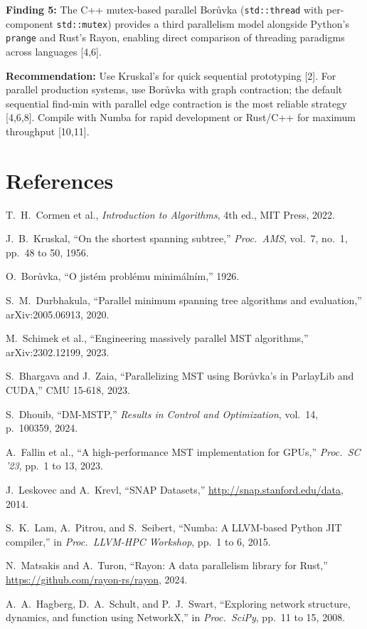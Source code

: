 \documentclass[12pt, a4paper]{article}
\begin{document}
\textbf{Finding 5:} The C++ mutex-based parallel Bor\r{u}vka (\texttt{std::thread} with per-component \texttt{std::mutex}) provides a third parallelism model alongside Python's \texttt{prange} and Rust's Rayon, enabling direct comparison of threading paradigms across languages [4,6].

\textbf{Recommendation:} Use Kruskal's for quick sequential prototyping [2]. For parallel production systems, use Bor\r{u}vka with graph contraction; the default sequential find-min with parallel edge contraction is the most reliable strategy [4,6,8]. Compile with Numba for rapid development or Rust/C++ for maximum throughput [10,11].

\newpage
\section*{References}
\begin{enumerate}[leftmargin=1.5cm, label={[\arabic*]}, itemsep=2pt, parsep=0pt]
    \item T.~H.\ Cormen et al., \textit{Introduction to Algorithms}, 4th ed., MIT Press, 2022.
    \item J.~B.\ Kruskal, ``On the shortest spanning subtree,'' \textit{Proc.\ AMS}, vol.~7, no.~1, pp.~48 to 50, 1956.
    \item O.\ Bor\r{u}vka, ``O jist\'{e}m probl\'{e}mu minim\'{a}ln\'{i}m,'' 1926.
    \item S.~M.\ Durbhakula, ``Parallel minimum spanning tree algorithms and evaluation,'' arXiv:2005.06913, 2020.
    \item M.\ Schimek et al., ``Engineering massively parallel MST algorithms,'' arXiv:2302.12199, 2023.
    \item S.\ Bhargava and J.\ Zaia, ``Parallelizing MST using Bor\r{u}vka's in ParlayLib and CUDA,'' CMU 15-618, 2023.
    \item S.\ Dhouib, ``DM-MSTP,'' \textit{Results in Control and Optimization}, vol.~14, p.~100359, 2024.
    \item A.\ Fallin et al., ``A high-performance MST implementation for GPUs,'' \textit{Proc.\ SC '23}, pp.~1 to 13, 2023.
    \item J.\ Leskovec and A.\ Krevl, ``SNAP Datasets,'' \url{http://snap.stanford.edu/data}, 2014.
    \item S.\ K.\ Lam, A.\ Pitrou, and S.\ Seibert, ``Numba: A LLVM-based Python JIT compiler,'' in \textit{Proc.\ LLVM-HPC Workshop}, pp.~1 to 6, 2015.
    \item N.\ Matsakis and A.\ Turon, ``Rayon: A data parallelism library for Rust,'' \url{https://github.com/rayon-rs/rayon}, 2024.
    \item A.~A.\ Hagberg, D.~A.\ Schult, and P.~J.\ Swart, ``Exploring network structure, dynamics, and function using NetworkX,'' in \textit{Proc.\ SciPy}, pp.~11 to 15, 2008.
\end{enumerate}
\end{document}

